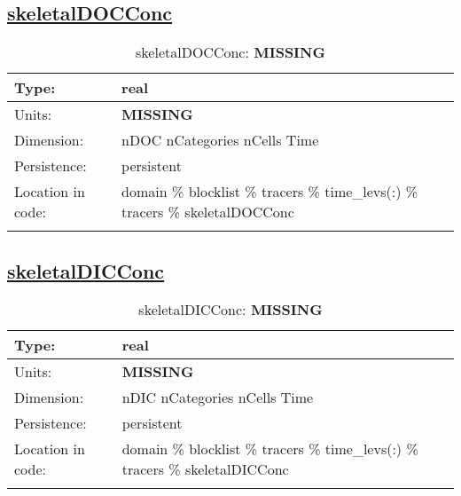 \subsection[skeletalDOCConc]{\hyperref[sec:var_tab_tracers]{skeletalDOCConc}}
\label{subsec:var_sec_tracers_skeletalDOCConc}
\begin{center}
\begin{longtable}{| p{2.0in} | p{4.0in} |}
        \hline 
        Type: & real \\
        \hline 
        Units: & {\bf \color{red} MISSING} \\
        \hline 
        Dimension: & nDOC nCategories nCells Time \\
        \hline 
        Persistence: & persistent \\
        \hline 
         Location in code: & domain \% blocklist \% tracers \% time\_levs(:) \% tracers \% skeletalDOCConc \\
         \hline 
    \caption{skeletalDOCConc: {\bf \color{red} MISSING}}
\end{longtable}
\end{center}
\subsection[skeletalDICConc]{\hyperref[sec:var_tab_tracers]{skeletalDICConc}}
\label{subsec:var_sec_tracers_skeletalDICConc}
\begin{center}
\begin{longtable}{| p{2.0in} | p{4.0in} |}
        \hline 
        Type: & real \\
        \hline 
        Units: & {\bf \color{red} MISSING} \\
        \hline 
        Dimension: & nDIC nCategories nCells Time \\
        \hline 
        Persistence: & persistent \\
        \hline 
         Location in code: & domain \% blocklist \% tracers \% time\_levs(:) \% tracers \% skeletalDICConc \\
         \hline 
    \caption{skeletalDICConc: {\bf \color{red} MISSING}}
\end{longtable}
\end{center}
